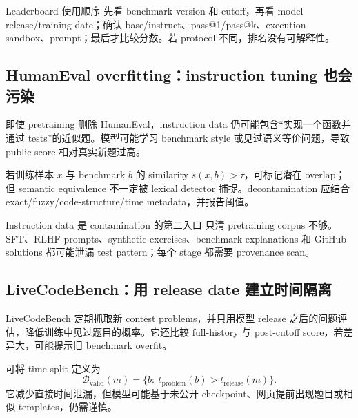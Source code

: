 
\begin{knowledgebox}{Leaderboard 使用顺序}
先看 benchmark version 和 cutoff，再看 model release/training date；确认 base/instruct、pass@1/pass@k、execution sandbox、prompt；最后才比较分数。若 protocol 不同，排名没有可解释性。
\end{knowledgebox}

\subsection{HumanEval overfitting：instruction tuning 也会污染}

即使 pretraining 删除 HumanEval，instruction data 仍可能包含“实现一个函数并通过 tests”的近似题。模型可能学习 benchmark style 或见过语义等价问题，导致 public score 相对真实新题过高。


若训练样本 $x$ 与 benchmark $b$ 的 similarity $s(x,b)>\tau$，可标记潜在 overlap；但 semantic equivalence 不一定被 lexical detector 捕捉。decontamination 应结合 exact/fuzzy/code-structure/time metadata，并报告阈值。

\begin{warningbox}{Instruction data 是 contamination 的第二入口}
只清 pretraining corpus 不够。SFT、RLHF prompts、synthetic exercises、benchmark explanations 和 GitHub solutions 都可能泄漏 test pattern；每个 stage 都需要 provenance scan。
\end{warningbox}

\subsection{LiveCodeBench：用 release date 建立时间隔离}

LiveCodeBench 定期抓取新 contest problems，并只用模型 release 之后的问题评估，降低训练中见过题目的概率。它还比较 full-history 与 post-cutoff score，若差异大，可能提示旧 benchmark overfit。


可将 time-split 定义为
\[
\mathcal{B}_{\text{valid}}(m)=\{b:\ t_{\text{problem}}(b)>t_{\text{release}}(m)\}.
\]
它减少直接时间泄漏，但模型可能基于未公开 checkpoint、网页提前出现题目或相似 templates，仍需谨慎。

